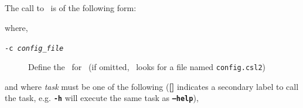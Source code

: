 \vspace*{4mm}

\subsection{\label{sec:command-line-arguments}}

The call to \CNAME\ is of the following form:

\texttt{}

where,

\begin{description}
  \item [\texttt{-c \emph{config\_file}}] Define the \config\ for \CNAME\ (if omitted, \CNAME\ looks for a file named \texttt{config.csl2})
\end{description}

and where \emph{task} must be one of the following (\textbf{[]} indicates a secondary label to call the task, e.g. \textbf{\texttt{-h}} will execute the same task as \textbf{\texttt{--help}}),

